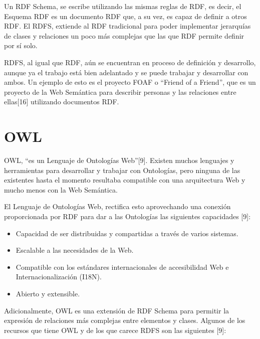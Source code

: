 Un RDF Schema, se escribe utilizando las mismas reglas de RDF, es decir, el Esquema RDF es un documento RDF que, a su vez, es capaz de definir a otros RDF. El RDFS, extiende al RDF tradicional para poder implementar jerarquías de clases y relaciones un poco más complejas que las que RDF permite definir por sí solo.

RDFS, al igual que RDF, aún se encuentran en proceso de definición y desarrollo, aunque ya el trabajo está bien adelantado y se puede trabajar y desarrollar con ambos. Un ejemplo de esto es el proyecto FOAF o ``Friend of a Friend'', que es un proyecto de la Web Semántica para describir personas y las relaciones entre ellas[16] utilizando documentos RDF.

\section{OWL}

OWL, ``es un Lenguaje de Ontologías Web''[9]. Existen muchos lenguajes y herramientas para desarrollar y trabajar con Ontologías, pero ninguna de las existentes hasta el momento resultaba compatible con una arquitectura Web y mucho menos con la Web Semántica. 

El Lenguaje de Ontologías Web, rectifica esto aprovechando una conexión proporcionada por RDF para dar a las Ontologías las siguientes capacidades [9]:

\begin{itemize}
\item Capacidad de ser distribuidas y compartidas a través de varios sistemas.
\item Escalable a las necesidades de la Web.
\item Compatible con los estándares internacionales de accesibilidad Web e Internacionalización (I18N).
\item Abierto y extensible.
\end{itemize}

Adicionalmente, OWL es una extensión de RDF Schema para permitir la expresión de relaciones más complejas entre elementos y clases. Algunos de los recursos que tiene OWL y de los que carece RDFS son las siguientes [9]:

